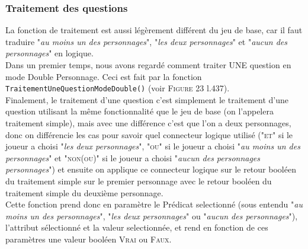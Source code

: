 \documentclass{article}
\begin{document}
            \subsubsection{Traitement des questions}
                La fonction de traitement est aussi légèrement différent du jeu de base, car il faut traduire "\textsl{au moins un des personnages}", "\textsl{les deux personnages}" et "\textsl{aucun des personnages}" en logique.\\
                Dans un premier temps, nous avons regardé comment traiter UNE question en mode \textsf{Double Personnage}. Ceci est fait par la fonction \texttt{TraitementUneQuestionModeDouble()} (voir \textsc{Figure 23 }l.437).\\
                Finalement, le traitement d'une question c'est simplement le traitement d'une question utilisant la même fonctionnalité que le jeu de base (on l'appelera traitement simple), mais avec une différence c'est que l'on a deux personnages, donc on différencie les cas pour savoir quel connecteur logique utilisé ("\textsc{et}" si le joueur a choisi "\textsl{les deux personnages}", "\textsc{ou}" si le joueur a choisi "\textsl{au moins un des personnages}" et "\textsc{non(ou)}" si le joueur a choisi "\textsl{aucun des personnages personnages}") et ensuite on applique ce connecteur logique sur le retour booléen du traitement simple sur le premier personnage avec le retour booléen du traitement simple du deuxième personnage.\\
                Cette fonction prend donc en paramètre le \textsf{Prédicat} selectionné (sous entendu "\textsl{au moins un des personnages}", "\textsl{les deux personnages}" ou "\textsl{aucun des personnages}"), l'attribut sélectionné et la valeur selectionnée, et rend en fonction de ces paramètres une valeur booléen \textsc{Vrai} ou \textsc{Faux}.
                
                \pagebreak
                
\end{document}
